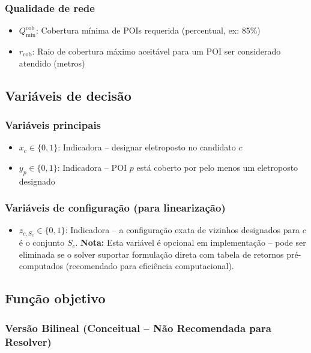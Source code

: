 \subsubsection{Qualidade de rede}

\begin{itemize}
    \item $Q_{\min}^{\text{cob}}$: Cobertura mínima de POIs requerida (percentual, ex: 85\%)
    \item $r_{\text{cob}}$: Raio de cobertura máximo aceitável para um POI ser considerado atendido (metros)
\end{itemize}

\subsection{Variáveis de decisão}

\subsubsection{Variáveis principais}

\begin{itemize}
    \item $x_c \in \{0,1\}$: Indicadora -- designar eletroposto no candidato $c$
    \item $y_p \in \{0,1\}$: Indicadora -- POI $p$ está coberto por pelo menos um eletroposto designado
\end{itemize}

\subsubsection{Variáveis de configuração (para linearização)}

\begin{itemize}
    \item $z_{c,S_c} \in \{0,1\}$: Indicadora -- a configuração exata de vizinhos designados para $c$ é o conjunto $S_c$. \textbf{Nota:} Esta variável é opcional em implementação -- pode ser eliminada se o solver suportar formulação direta com tabela de retornos pré-computados (recomendado para eficiência computacional).
\end{itemize}

\subsection{Função objetivo}

\subsubsection{Versão Bilineal (Conceitual -- Não Recomendada para Resolver)}

